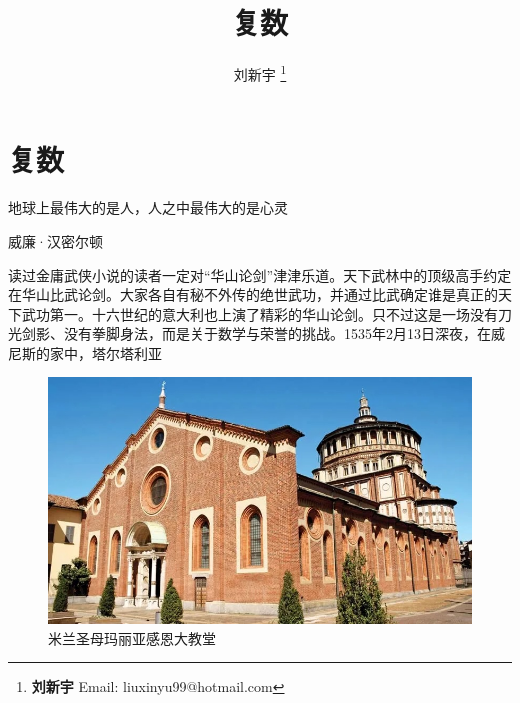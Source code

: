 \documentclass[b5paper]{ctexart}
\begin{document}
\title{复数}

\author{刘新宇
\thanks{{\bfseries 刘新宇} \newline
  Email: liuxinyu99@hotmail.com \newline}
  }

\maketitle
\fi


\ifx\wholebook\relax
\chapter{复数}
\fi

\epigraph{地球上最伟大的是人，人之中最伟大的是心灵}{威廉·汉密尔顿}

读过金庸武侠小说的读者一定对“华山论剑”津津乐道。天下武林中的顶级高手约定在华山比武论剑。大家各自有秘不外传的绝世武功，并通过比武确定谁是真正的天下武功第一。十六世纪的意大利也上演了精彩的华山论剑。只不过这是一场没有刀光剑影、没有拳脚身法，而是关于数学与荣誉的挑战。1535年2月13日深夜，在威尼斯的家中，塔尔塔利亚

\begin{figure}[htbp]
  \centering
  \includegraphics[scale=0.33]{img/churchmilan}
  \caption{米兰圣母玛丽亚感恩大教堂}
 \label{fig:church-Milan}
\end{figure}

\end{document}
